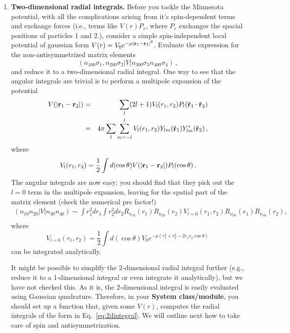 \documentclass[letterpaper,12pt]{article}
\begin{document}
\begin{enumerate}
\item {\bf Two-dimensional radial integrals.} Before you tackle the Minnesota potential, with all the complications arising from it's spin-dependent terms and exchange forces (i.e., terms like $V(r)P_r$, where $P_r$ exchanges the spacial positions of particles 1 and 2.), consider a simple spin-independent local potential of gaussian form $V(r)=V_0e^{-\mu|{\bf r}_1-{\bf r}_2|^2}$. Evaluate the expression for the non-antisymmetrized matrix elements 
\begin{equation}
\label{eq:nonsymmetrized}
(n_100\sigma_1,n_200\sigma_2|V|n_300\sigma_3n_400\sigma_4)\,,
\end{equation}
and reduce it to a two-dimensional radial integral. One way to see that the angular integrals are trivial is to perform a multipole expansion of the potential
\begin{eqnarray}
V(|{\bf r}_1-{\bf r}_2|) &=& \sum_{l} (2l+1)V_l(r_1,r_2) P_l(\hat{{\bf r}}_1\cdot\hat{{\bf r}}_2)\\
&=& 4\pi\sum_{l}\sum_{m=-l}^{l}V_l(r_1,r_2)Y_{lm}(\hat{{\bf r}}_1)Y^*_{lm}(\hat{{\bf r}}_2)\,, 
\end{eqnarray}
where 
\begin{equation}
V_l(r_1,r_2)=\frac{1}{2}\int d(\cos\theta) V(|{\bf r}_1-{\bf r}_2|)P_l(\cos\theta)\,.
\end{equation}
The angular integrals are now easy; you should find that they pick out the $l=0$ term in the multipole expansion, leaving for the spatial part of the matrix element (check the numerical pre factor!)
\begin{eqnarray}
\label{eq:2dintegral}
 (n_10n_20|V|n_30n_40)
 \sim \int\! r_1^2dr_1\int\! r_2^2dr_2 R_{n_10}(r_1)R_{n_20}(r_2)V_{l=0}(r_1,r_2)R_{n_30}(r_1)R_{n_40}(r_2),\nonumber\\
 \end{eqnarray}
where 
\begin{equation}
V_{l=0}(r_1,r_2) = \frac{1}{2}\int d(\cos\theta)V_0 e^{-\mu(r_1^2+r_2^2 -2r_1r_2\cos\theta)} \,
\end{equation}
can be integrated analytically. 

It might be possible to simplify the 2-dimensional radial integral further (e.g., reduce it to a 1-dimensional integral or even integrate it analytically), but we have not checked this.  As it is, the 2-dimensional integral is easily evaluated using Gaussian quadrature. Therefore, in your {\bf System class/module}, you should set up a function that, given some $V(r)$, computes the radial integrals of the form in Eq.~\ref{eq:2dintegral}. We will outline next how to take care of spin and antisymmetrization.


\end{enumerate}
\end{document}
